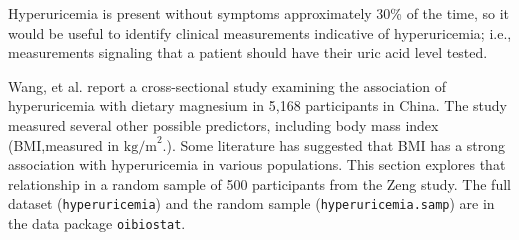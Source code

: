 Hyperuricemia is present without symptoms approximately 30\% of the time, so it would be useful to identify clinical measurements indicative of hyperuricemia; i.e., measurements signaling that a patient should have their uric acid level tested.

Wang, et al. report a cross-sectional study examining the association of hyperuricemia with dietary magnesium in 5,168 participants in China. The study measured several other possible predictors, including body mass index (BMI,measured in  $\text{kg/m}^2$.).  Some literature has suggested that BMI has a strong association with hyperuricemia in various populations. This section explores that relationship in a random sample of 500 participants from the Zeng study. The full dataset (\texttt{hyperuricemia}) and the random sample (\texttt{hyperuricemia.samp}) are in the data package \texttt{oibiostat}.

 
